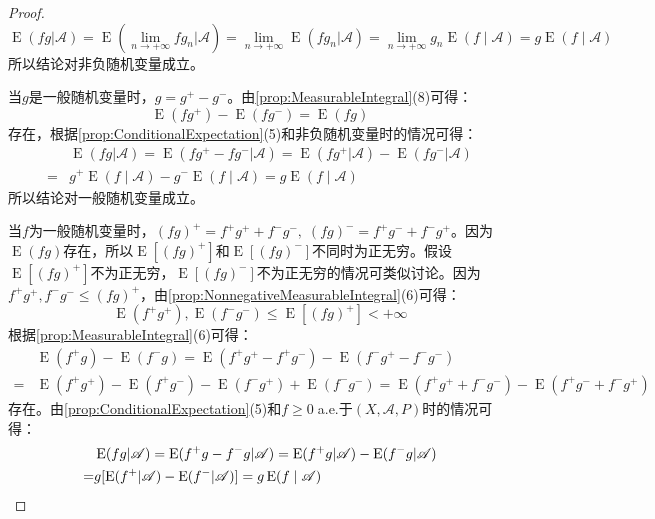 \begin{proof}
	\begin{equation*}
		\operatorname{E}(fg|\mathscr{A})=\operatorname{E}\left(\lim_{n\to+\infty}fg_n\Big|\mathscr{A}\right)=\lim_{n\to+\infty}\operatorname{E}(fg_n|\mathscr{A})=\lim_{n\to+\infty}g_n\operatorname{E}(f\mid\mathscr{A})=g\operatorname{E}(f\mid\mathscr{A})
	\end{equation*}
	所以结论对非负随机变量成立。\par
	当$g$是一般随机变量时，$g=g^+-g^-$。由\cref{prop:MeasurableIntegral}(8)可得：
	\begin{equation*}
		\operatorname{E}(fg^+)-\operatorname{E}(fg^-)=\operatorname{E}(fg)
	\end{equation*}
	存在，根据\cref{prop:ConditionalExpectation}(5)和非负随机变量时的情况可得：
	\begin{align*}
		&\operatorname{E}(fg|\mathscr{A})=\operatorname{E}(fg^+-fg^-|\mathscr{A})=\operatorname{E}(fg^+|\mathscr{A})-\operatorname{E}(fg^-|\mathscr{A}) \\
		=&g^+\operatorname{E}(f\mid\mathscr{A})-g^-\operatorname{E}(f\mid\mathscr{A})=g\operatorname{E}(f\mid\mathscr{A})
	\end{align*}
	所以结论对一般随机变量成立。\par
	当$f$为一般随机变量时，$(fg)^+=f^+g^++f^-g^-,\;(fg)^-=f^+g^-+f^-g^+$。因为$\operatorname{E}(fg)$存在，所以$\operatorname{E}[(fg)^+]$和$\operatorname{E}[(fg)^-]$不同时为正无穷。假设$\operatorname{E}[(fg)^+]$不为正无穷，$\operatorname{E}[(f g)^-]$不为正无穷的情况可类似讨论。因为$f^+g^+,f^-g^-\leqslant(fg)^+$，由\cref{prop:NonnegativeMeasurableIntegral}(6)可得：
	\begin{equation*}
		\operatorname{E}(f^+g^+),\operatorname{E}(f^-g^-)\leqslant\operatorname{E}[(fg)^+]<+\infty
	\end{equation*}
	根据\cref{prop:MeasurableIntegral}(6)可得：
	\begin{align*}
		&\operatorname{E}(f^+g)-\operatorname{E}(f^-g)=\operatorname{E}(f^+g^+-f^+g^-)-\operatorname{E}(f^-g^+-f^-g^-) \\
		=&\operatorname{E}(f^+g^+)-\operatorname{E}(f^+g^-)-\operatorname{E}(f^-g^+)+\operatorname{E}(f^-g^-)=\operatorname{E}(f^+g^++f^-g^-)-\operatorname{E}(f^+g^-+f^-g^+)
	\end{align*}
	存在。由\cref{prop:ConditionalExpectation}(5)和$f\geqslant0\;$a.e.于$(X,\mathscr{A},P)$时的情况可得：
	\begin{align*}
		&\operatorname{E}(fg|\mathscr{A})=\operatorname{E}(f^+g-f^-g|\mathscr{A})=\operatorname{E}(f^+g|\mathscr{A})-\operatorname{E}(f^-g|\mathscr{A}) \\
		=&g[\operatorname{E}(f^+|\mathscr{A})-\operatorname{E}(f^-|\mathscr{A})]=g\operatorname{E}(f\mid\mathscr{A})\qedhere
	\end{align*}
\end{proof}


